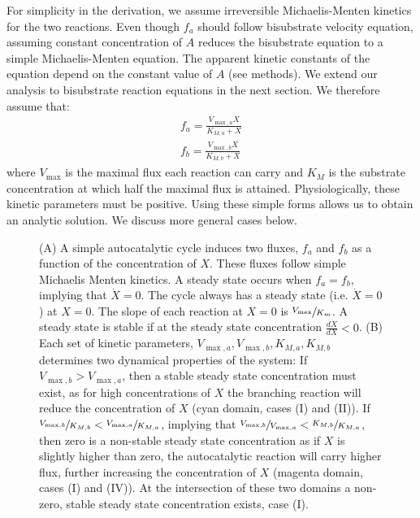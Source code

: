 For simplicity in the derivation, we assume irreversible Michaelis-Menten kinetics for the two reactions.
Even though $f_a$ should follow bisubstrate velocity equation, assuming constant concentration of $A$ reduces the bisubstrate equation to a simple Michaelis-Menten equation.
The apparent kinetic constants of the equation depend on the constant value of $A$ (see methods).
We extend our analysis to bisubstrate reaction equations in the next section.
We therefore assume that:
    \begin{eqnarray*}
      f_a = \frac{V_{\max,a}X}{K_{M,a}+X} \\
      f_b = \frac{V_{\max,b}X}{K_{M,b}+X}
    \end{eqnarray*}
    where $V_{\max}$ is the maximal flux each reaction can carry and $K_M$ is the substrate concentration at which half the maximal flux is attained.
    Physiologically, these kinetic parameters must be positive.
    Using these simple forms allows us to obtain an analytic solution.
    We discuss more general cases below.
    \begin{figure}[!htb]
      
      \caption{\label{fig:simplecycle}
        (A) A simple autocatalytic cycle induces two fluxes, $f_a$ and $f_b$ as a function of the concentration of $X$.
        These fluxes follow simple Michaelis Menten kinetics.
        A steady state occurs when $f_a=f_b$, implying that $\dot{X}=0$.
        The cycle always has a steady state (i.e. $\dot{X}=0$) at $X=0$.
        The slope of each reaction at $X=0$ is $\sfrac{V_{\max}}{K_m}$.
        A steady state is stable if at the steady state concentration $\frac{d\dot{X}}{dX}<0$.
        (B) Each set of kinetic parameters, $V_{\max,a},V_{\max,b},K_{M,a},K_{M,b}$ determines two dynamical properties of the system:
        If $V_{\max,b}>V_{\max,a}$, then a stable steady state concentration must exist, as for high concentrations of $X$ the branching reaction will reduce the concentration of $X$ (cyan domain, cases (I) and (II)).
        If $\sfrac{V_{\max,b}}{K_{M,b}}<\sfrac{V_{\max,a}}{K_{M,a}}$, implying that $\sfrac{V_{\max,b}}{V_{\max,a}}<\sfrac{K_{M,b}}{K_{M,a}}$, then zero is a non-stable steady state concentration as if $X$ is slightly higher than zero, the autocatalytic reaction will carry higher flux, further increasing the concentration of $X$ (magenta domain, cases (I) and (IV)).
    At the intersection of these two domains a non-zero, stable steady state concentration exists, case (I).}
    \end{figure}

